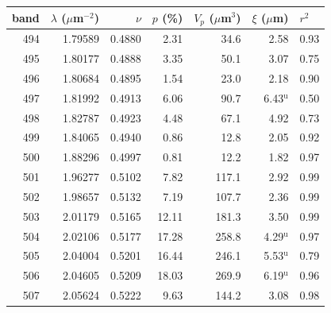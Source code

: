 \begin{tabular}{@{}rrrrrrl@{}}
\hline\hline
 band & $\lambda$ ($\mu$m$^{-2}$) & $\nu$ & $p$ (\%) & $V_p$ ($\mu$m$^3$) & $\xi$ ($\mu$m) & $r^2$ \\
\hline
 494 & 1.79589 & 0.4880 & 2.31 & 34.6 & 2.58 & 0.93 \\
 495 & 1.80177 & 0.4888 & 3.35 & 50.1 & 3.07 & 0.75 \\
 496 & 1.80684 & 0.4895 & 1.54 & 23.0 & 2.18 & 0.90 \\
 497 & 1.81992 & 0.4913 & 6.06 & 90.7 & 6.43$^\mathrm{u}$ & 0.50 \\
 498 & 1.82787 & 0.4923 & 4.48 & 67.1 & 4.92 & 0.73 \\
 499 & 1.84065 & 0.4940 & 0.86 & 12.8 & 2.05 & 0.92 \\
 500 & 1.88296 & 0.4997 & 0.81 & 12.2 & 1.82 & 0.97 \\
 501 & 1.96277 & 0.5102 & 7.82 & 117.1 & 2.92 & 0.99 \\
 502 & 1.98657 & 0.5132 & 7.19 & 107.7 & 2.36 & 0.99 \\
 503 & 2.01179 & 0.5165 & 12.11 & 181.3 & 3.50 & 0.99 \\
 504 & 2.02106 & 0.5177 & 17.28 & 258.8 & 4.29$^\mathrm{u}$ & 0.97 \\
 505 & 2.04004 & 0.5201 & 16.44 & 246.1 & 5.53$^\mathrm{u}$ & 0.79 \\
 506 & 2.04605 & 0.5209 & 18.03 & 269.9 & 6.19$^\mathrm{u}$ & 0.96 \\
 507 & 2.05624 & 0.5222 & 9.63 & 144.2 & 3.08 & 0.98 \\
\hline\hline
\end{tabular}
